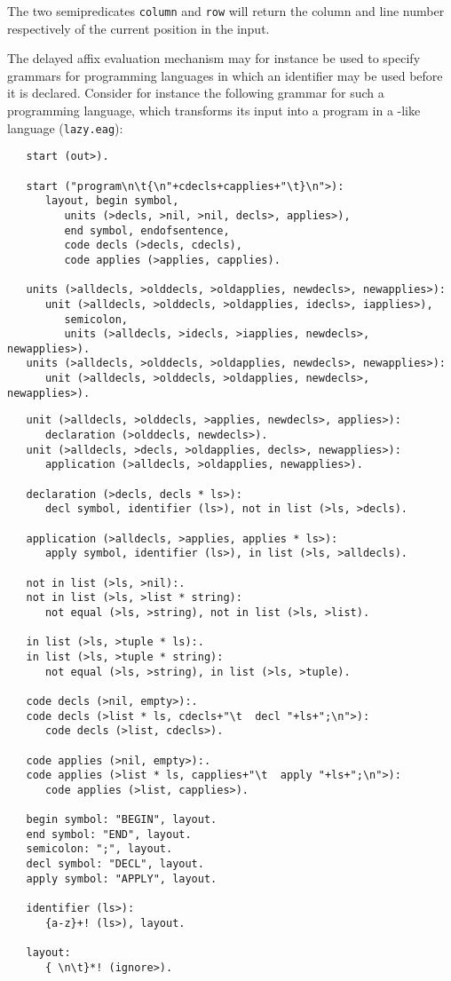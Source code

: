 The two semipredicates {\tt column} and {\tt row} will return
the column and line number respectively of the current position
in the input.

The delayed affix evaluation mechanism may for instance be used
to specify grammars for programming languages in which an
identifier may be used before it is declared. Consider for instance
the following grammar for such a programming language, which
transforms its input into a program in a \Cns-like language
({\tt lazy.eag}):
\begin{verbatim}
   start (out>).

   start ("program\n\t{\n"+cdecls+capplies+"\t}\n">):
      layout, begin symbol,
         units (>decls, >nil, >nil, decls>, applies>),
         end symbol, endofsentence,
         code decls (>decls, cdecls),
         code applies (>applies, capplies).

   units (>alldecls, >olddecls, >oldapplies, newdecls>, newapplies>):
      unit (>alldecls, >olddecls, >oldapplies, idecls>, iapplies>),
         semicolon,
         units (>alldecls, >idecls, >iapplies, newdecls>, newapplies>).
   units (>alldecls, >olddecls, >oldapplies, newdecls>, newapplies>):
      unit (>alldecls, >olddecls, >oldapplies, newdecls>, newapplies>).
\end{verbatim}
\newpage
\begin{verbatim}
   unit (>alldecls, >olddecls, >applies, newdecls>, applies>):
      declaration (>olddecls, newdecls>).
   unit (>alldecls, >decls, >oldapplies, decls>, newapplies>):
      application (>alldecls, >oldapplies, newapplies>).

   declaration (>decls, decls * ls>):
      decl symbol, identifier (ls>), not in list (>ls, >decls).

   application (>alldecls, >applies, applies * ls>):
      apply symbol, identifier (ls>), in list (>ls, >alldecls).

   not in list (>ls, >nil):.
   not in list (>ls, >list * string):
      not equal (>ls, >string), not in list (>ls, >list).

   in list (>ls, >tuple * ls):.
   in list (>ls, >tuple * string):
      not equal (>ls, >string), in list (>ls, >tuple).

   code decls (>nil, empty>):.
   code decls (>list * ls, cdecls+"\t  decl "+ls+";\n">):
      code decls (>list, cdecls>).

   code applies (>nil, empty>):.
   code applies (>list * ls, capplies+"\t  apply "+ls+";\n">):
      code applies (>list, capplies>).

   begin symbol: "BEGIN", layout.
   end symbol: "END", layout.
   semicolon: ";", layout.
   decl symbol: "DECL", layout.
   apply symbol: "APPLY", layout.

   identifier (ls>):
      {a-z}+! (ls>), layout.

   layout:
      { \n\t}*! (ignore>).
\end{verbatim}
